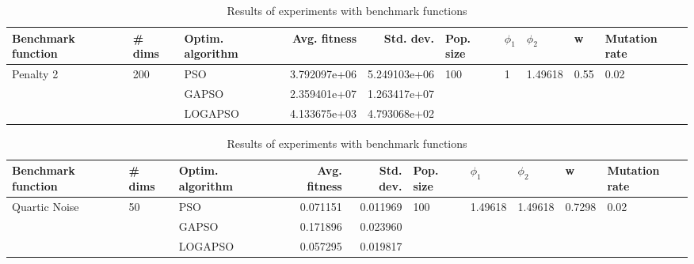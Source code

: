 \documentclass{article}
\begin{document}
\begin{table}
\centering
\caption{Results of experiments with benchmark functions}
\begin{tabular}{lllrrlllll}
\toprule
        Benchmark function &              \# dims & Optim. algorithm &  Avg. fitness &    Std. dev. &            Pop. size &         $\phi_{1}$ &               $\phi_{2}$ &                     w &         Mutation rate \\
\midrule
\multirow{3}{*}{Penalty 2} & \multirow{3}{*}{200} &              PSO &  3.792097e+06 & 5.249103e+06 & \multirow{3}{*}{100} & \multirow{3}{*}{1} & \multirow{3}{*}{1.49618} & \multirow{3}{*}{0.55} & \multirow{3}{*}{0.02} \\
                           &                      &            GAPSO &  2.359401e+07 & 1.263417e+07 &                      &                    &                          &                       &                       \\
                           &                      &          LOGAPSO &  4.133675e+03 & 4.793068e+02 &                      &                    &                          &                       &                       \\
\bottomrule
\end{tabular}
\end{table}
\begin{table}
\centering
\caption{Results of experiments with benchmark functions}
\begin{tabular}{lllrrlllll}
\toprule
            Benchmark function &             \# dims & Optim. algorithm &  Avg. fitness &  Std. dev. &            Pop. size &               $\phi_{1}$ &               $\phi_{2}$ &                       w &         Mutation rate \\
\midrule
\multirow{3}{*}{Quartic Noise} & \multirow{3}{*}{50} &              PSO &      0.071151 &   0.011969 & \multirow{3}{*}{100} & \multirow{3}{*}{1.49618} & \multirow{3}{*}{1.49618} & \multirow{3}{*}{0.7298} & \multirow{3}{*}{0.02} \\
                               &                     &            GAPSO &      0.171896 &   0.023960 &                      &                          &                          &                         &                       \\
                               &                     &          LOGAPSO &      0.057295 &   0.019817 &                      &                          &                          &                         &                       \\
\bottomrule
\end{tabular}
\end{table}
\end{document}
